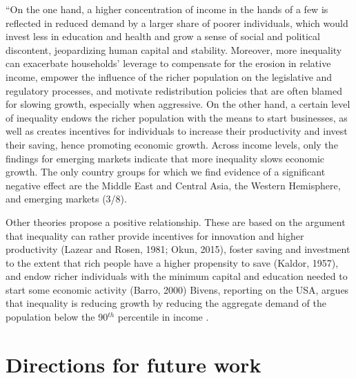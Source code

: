  ``On the one hand, a higher concentration of income in the hands of a few is reflected in reduced demand by a larger share of poorer individuals, which would invest less in education and health and grow a sense of social and political discontent, jeopardizing human capital and stability. Moreover, more inequality can exacerbate households' leverage to compensate for the erosion in relative income, empower the influence of the richer population on the legislative and regulatory processes, and motivate redistribution policies that are often blamed for slowing growth, especially when aggressive. On the other hand, a certain level of inequality endows the richer population with the means to start businesses, as well as creates incentives for individuals to increase their productivity and invest their saving, hence promoting economic growth. Across income levels, only the findings for emerging markets indicate that more inequality slows economic growth. The only country groups for which we find evidence of a significant negative effect are the Middle East and Central Asia, the Western Hemisphere, and emerging markets (3/8).

 
 Other theories propose a positive relationship. These are based on the argument that inequality can rather provide incentives for innovation and higher productivity (Lazear and Rosen, 1981; Okun, 2015), foster saving and investment to the extent that rich people have a higher propensity to save (Kaldor, 1957), and endow richer individuals with the minimum capital and education needed to start some economic activity (Barro, 2000)
Bivens, reporting on the USA, argues that inequality is reducing growth by reducing the aggregate demand of the population below the 90$^{th}$ percentile in income \cite{bivensInequalitySlowingUS2017}.


\section{Directions for future work}


